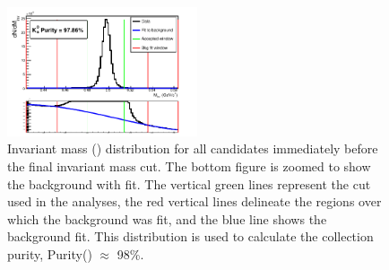 \documentclass[/home/jesse/Analysis/FemtoAnalysis/AnalysisNotes/AnalysisNoteJBuxton.tex]{subfiles}
\begin{document}
\begin{figure}[h]
  \centering
  \includegraphics[width=0.5\textwidth]{3_DataSelection/Figures/K0Purity_LamK0.pdf}
  \caption[\Ks Purity]{Invariant mass (\minv) distribution for all \Ks candidates immediately before the final invariant mass cut.  The bottom figure is zoomed to show the background with fit.  The vertical green lines represent the \minv cut used in the analyses, the red vertical lines delineate the regions over which the background was fit, and the blue line shows the background fit.  This distribution is used to calculate the collection purity, Purity(\Ks) $\approx$ 98\%.}
  \label{fig:K0Purity}
\end{figure}
\end{document}
